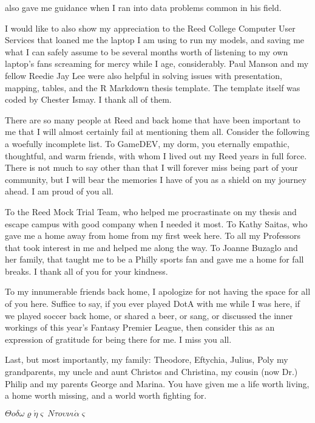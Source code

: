 \documentclass[12pt,twoside]{reedthesis}
\begin{document}
\begin{preface}
      also gave me guidance when I ran into data problems common in his field.
      \par I would like to also show my appreciation to the Reed College
      Computer User Services that loaned me the laptop I am using to run my
      models, and saving me what I can safely assume to be several months
      worth of listening to my own laptop's fans screaming for mercy while I
      age, considerably. Paul Manson and my fellow Reedie Jay Lee were also
      helpful in solving issues with presentation, mapping, tables, and the R
      Markdown thesis template. The template itself was coded by Chester
      Ismay. I thank all of them. \par There are so many people at Reed and
      back home that have been important to me that I will almost certainly
      fail at mentioning them all. Consider the following a woefully
      incomplete list. To GameDEV, my dorm, you eternally empathic,
      thoughtful, and warm friends, with whom I lived out my Reed years in
      full force. There is not much to say other than that I will forever miss
      being part of your community, but I will bear the memories I have of you
      as a shield on my journey ahead. I am proud of you all. \par To the Reed
      Mock Trial Team, who helped me procrastinate on my thesis and escape
      campus with good company when I needed it most. To Kathy Saitas, who
      gave me a home away from home from my first week here. To all my
      Professors that took interest in me and helped me along the way. To
      Joanne Buzaglo and her family, that taught me to be a Philly sports fan
      and gave me a home for fall breaks. I thank all of you for your
      kindness. \par To my innumerable friends back home, I apologize for not
      having the space for all of you here. Suffice to say, if you ever played
      DotA with me while I was here, if we played soccer back home, or shared
      a beer, or sang, or discussed the inner workings of this year's Fantasy
      Premier League, then consider this as an expression of gratitude for
      being there for me. I miss you all. \par Last, but most importantly, my
      family: Theodore, Eftychia, Julius, Poly my grandparents, my uncle and
      aunt Christos and Christina, my cousin (now Dr.) Philip and my parents
      George and Marina. You have given me a life worth living, a home worth
      missing, and a world worth fighting for. \par 
      
      \begin{center} $\Theta o \delta \omega \varrho\acute\eta\varsigma~N\tau o\upsilon \nu \iota \acute{\alpha}\varsigma$  \end{center}
    \end{preface}
  
\end{document}
